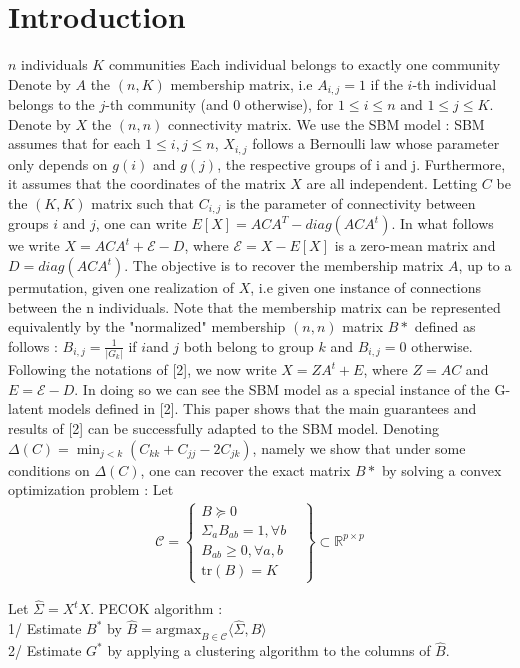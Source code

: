 \section*{Introduction}
$n$ individuals
$K$ communities
Each individual belongs to exactly one community
Denote by $A$ the $(n,K)$ membership matrix, i.e $A_{i,j} = 1$ if the $i$-th individual belongs to the $j$-th community (and $0$ otherwise), for $1\leq i \leq n$ and $1\leq j \leq K$.
Denote by $X$ the $(n,n)$ connectivity matrix.
We use the SBM model :
SBM assumes that for each $1 \leq i,j \leq n$, $X_{i,j}$ follows a Bernoulli law whose parameter only depends on $g(i)$ and $g(j)$, the respective groups of i and j. Furthermore, it assumes that the coordinates of the matrix $X$ are all independent.
Letting $C$ be the $(K,K)$ matrix such that $C_{i,j}$ is the parameter of connectivity between groups $i$ and $j$, one can write $E[X] = ACA^T - diag(ACA^t)$.
In what follows we write $X = ACA^t + \mathcal{E} - D$,
where $\mathcal{E} = X-E[X]$ is a zero-mean matrix and $D = diag(ACA^t)$.
The objective is to recover the membership matrix $A$, up to a permutation, given one realization of $X$, i.e given one instance of connections between the n individuals.
Note that the membership matrix can be represented equivalently by the "normalized" membership $(n,n)$ matrix $B*$ defined as follows :
$B_{i,j} = \frac{1}{|G_k|}$ if $i$and $j$ both belong to group $k$
and $B_{i,j} = 0$ otherwise. 
Following the notations of [2], we now write $X = ZA^t + E$, where $Z = AC$ and $E = \mathcal{E} - D$. In doing so we can see the SBM model as a special instance of the G-latent models defined in [2]. 
This paper shows that the main guarantees and results of [2] can be successfully adapted to the SBM model.
Denoting $\Delta(C) = \min_{j<k}(C_{kk}+C_{jj}-2C_{jk})$, namely we show that under some conditions on $\Delta(C)$, one can recover the exact matrix $B*$ by solving a convex optimization problem :
Let 
\begin{align*}
\mathcal{C} = \begin{Bmatrix}
  B \succeq 0 \\ \Sigma_a B_{ab}=1, \forall b
 & \\ B_{ab}\geq 0,\forall a,b
 & \\ \mbox{tr}(B) = K 
\end{Bmatrix}
\subset \mathbb{R}^{p\times p}
\end{align*}

Let $\widehat{\Sigma}=X^tX$.
PECOK algorithm : \\
1/ Estimate $B^*$ by $\widehat{B} = \displaystyle{\mbox{argmax}_{B\in \mathcal{C}}\langle\widehat{\Sigma},B\rangle}$\\
2/ Estimate $G^*$ by applying a clustering algorithm to the columns of $\widehat{B}$.

